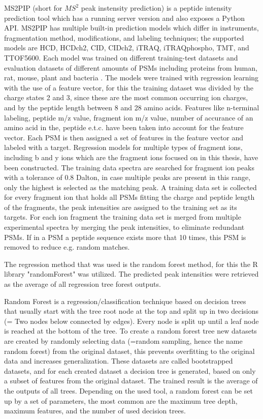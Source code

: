 \documentclass[11pt]{article}
\begin{document}
MS2PIP\cite{ms2pip, ms2pip-server} (short for \(MS^2\) peak instensity prediction) is a peptide intensity prediction tool which has a running server version and also exposes a Python API. MS2PIP has multiple built-in prediction models which differ in instruments, fragmentation method, modifications, and labeling techniques; the supported models are HCD, HCDch2, CID, CIDch2, iTRAQ, iTRAQphospho, TMT, and TTOF5600. Each model was trained on different training-test datasets and evaluation datasets of different amounts of PSMs including proteins from human, rat, mouse, plant and bacteria \cite{ms2pip}. The models were trained with regression learning with the use of a feature vector, for this the training dataset was divided by the charge states 2 and 3, since these are the most common occurring ion charges, and by the peptide length between 8 and 28 amino acids. Features like n-terminal labeling, peptide m/z value, fragment ion m/z value, number of accurance of an amino acid in the, peptide e.t.c. have been taken into account for the feature vector. Each PSM is then assigned a set of features in the feature vector and labeled with a target. Regression models for multiple types of fragment ions, including b and y ions which are the fragment ions focused on in this thesis, have been constructed. The training data spectra are searched for fragment ion peaks with a tolerance of 0.8 Dalton, in case multiple peaks are present in this range, only the highest is selected as the matching peak. A training data set is collected for every fragment ion that holds all PSMs fitting the charge and peptide length of the fragments, the peak intensities are assigned to the training set as its targets. For each ion fragment the training data set is merged from multiple experimental spectra by merging the peak intensities, to eliminate redundant PSMs. If in a PSM a peptide sequence exists more that 10 times, this PSM is removed to reduce e.g. random matches.

The regression method that was used is the random forest method, for this the R library "randomForest" was utilized. The predicted peak intensities were retrieved as the average of all regression tree forest outputs.

Random Forest \cite{random-forest} is a regression/classification technique based on decision trees that usually start with the tree root node at the top and split up in two decisions (= Two nodes below connected by edges). Every node is split up until a leaf node is reached at the bottom of the tree. To create a random forest tree new datasets are created by randomly selecting data (=random sampling, hence the name random forest) from the original dataset, this prevents overfitting to the original data and increases generalization. These datasets are called bootstrapped datasets, and for each created dataset a decision tree is generated, based on only a subset of features from the original dataset. The trained result is the average of the outputs of all trees. Depending on the used tool, a random forest can be set up by a set of parameters, the most common are the maximum tree depth, maximum features, and the number of used decision trees.
\end{document}
